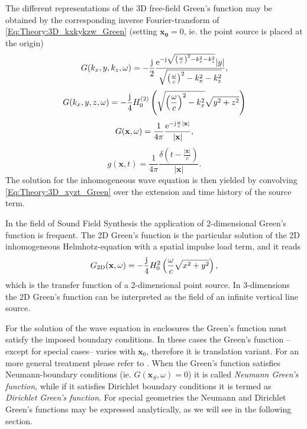 The different representations of the 3D free-field Green's function may be obtained by the corresponding inverse Fourier-transform of \eqref{Eq:Theory:3D_kxkykzw_Green} (setting $\mathbf{x_0} = 0$, ie. the point source is placed at the origin) \cite{Devaney2012, Ahrens2010a, Ahrens2012}
\begin{equation}
G(k_x,y,k_z,\omega ) = -\frac{\mathrm{j}}{2}\frac{\mathrm{e}^{-\mathrm{j} \sqrt{ \left( \frac{\omega}{c} \right)^2 - k_x^2 - k_z^2  }}|y|}{\sqrt{ \left( \frac{\omega}{c} \right)^2 - k_x^2 - k_z^2  }} ,
\label{Eq:Theory:3D_kxykzw_Green}
\end{equation}
\begin{equation}
G(k_x,y,z,\omega) = -\frac{\mathrm{j}}{4} H_0^{(2)}\left( \sqrt{ \left( \frac{\omega}{c} \right)^2 - k_x^2 } \sqrt{y^2 + z^2} \right)
\label{Eq:Theory:3D_kxyzw_Green}
\end{equation}
\begin{equation}
G(\mathbf{x},\omega) = \frac{1}{4\pi} \frac{\mathrm{e}^{ -\mathrm{j} \frac{\omega}{c}|\mathbf{x}| } }{ |\mathbf{x}| },
\label{Eq:Theory:3D_xyzw_Green}
\end{equation}
\begin{equation}
g(\mathbf{x},t) = \frac{1}{4\pi} \frac{\delta \left( t - \frac{|\mathbf{x}|}{c}  \right)}{|\mathbf{x}|}.
\label{Eq:Theory:3D_xyzt_Green}
\end{equation}
The solution for the inhomogeneous wave equation is then yielded by convolving \eqref{Eq:Theory:3D_xyzt_Green} over the extension and time history of the source term.

In the field of Sound Field Synthesis the application of 2-dimensional Green's function is frequent. The 2D Green's function is the particular solution of the 2D inhomogeneous Helmhotz-equation with a spatial impulse load term, and it reads \cite{Gibson2008}
\begin{equation}
G_{2\mathrm{D}}(\mathbf{x},\omega) = -\frac{\mathrm{j}}{4}H_0^{2}\left( \frac{\omega}{c} \sqrt{x^2 + y^2} \right),
\end{equation}
which is the transfer function of a 2-dimensional point source.
In 3-dimensions the 2D Green's function can be interpreted as the field of an infinite vertical line source.

\vspace{3mm}
For the solution of the wave equation in enclosures the Green's function must satisfy the imposed boundary conditions. In these cases the Green's function --except for special cases-- varies with $\mathbf{x}_0$, therefore it is translation variant.
For an more general treatment please refer to \cite{Spors2005}. 
When the Green's function satisfies Neumann-boundary conditions (ie. $G(\mathbf{x}_{S},\omega) = 0$) it is called \emph{Neumann Green's function}, while if it satisfies Dirichlet boundary conditions it is termed as \emph{Dirichlet Green's function}.
For special geometries the Neumann and Dirichlet Green's functions may be expressed analytically, as we will see in the following section.

